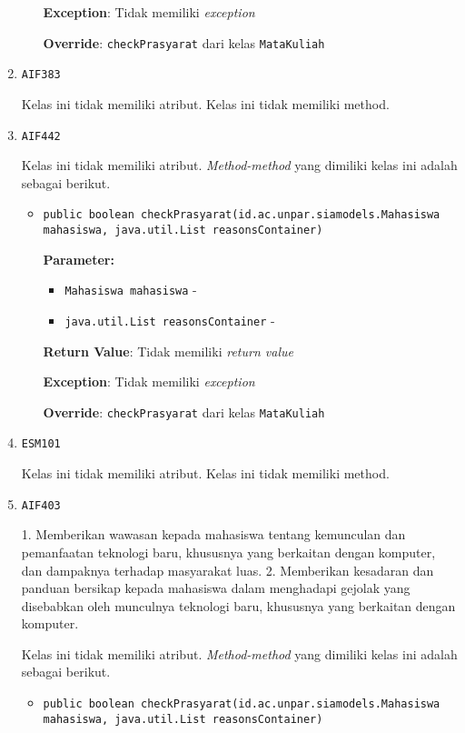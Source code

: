 \documentclass{article}
\begin{document}
\begin{enumerate}
\begin{itemize}
\textbf{Exception}: Tidak memiliki \textit{exception}

\textbf{Override}: \texttt{checkPrasyarat} dari kelas \texttt{MataKuliah}

\end{itemize}
\item \texttt{AIF383}



Kelas ini tidak memiliki atribut. Kelas ini tidak memiliki method. \item \texttt{AIF442}



Kelas ini tidak memiliki atribut. \textit{Method-method} yang dimiliki kelas ini adalah sebagai berikut.
\begin{itemize}
\item \texttt{public boolean checkPrasyarat(id.ac.unpar.siamodels.Mahasiswa mahasiswa, java.util.List reasonsContainer)}

\textbf{Parameter:}
\begin{itemize}
\item \texttt{Mahasiswa mahasiswa} - 
\item \texttt{java.util.List reasonsContainer} - 
\end{itemize}
\textbf{Return Value}: Tidak memiliki \textit{return value}

\textbf{Exception}: Tidak memiliki \textit{exception}

\textbf{Override}: \texttt{checkPrasyarat} dari kelas \texttt{MataKuliah}

\end{itemize}
\item \texttt{ESM101}



Kelas ini tidak memiliki atribut. Kelas ini tidak memiliki method. \item \texttt{AIF403}

1. Memberikan wawasan kepada mahasiswa tentang kemunculan dan pemanfaatan teknologi baru, 
 khususnya yang berkaitan dengan komputer, dan dampaknya terhadap masyarakat luas.
 2. Memberikan kesadaran dan panduan bersikap kepada mahasiswa dalam menghadapi gejolak yang
 disebabkan oleh munculnya teknologi baru, khususnya yang berkaitan dengan komputer.

Kelas ini tidak memiliki atribut. \textit{Method-method} yang dimiliki kelas ini adalah sebagai berikut.
\begin{itemize}
\item \texttt{public boolean checkPrasyarat(id.ac.unpar.siamodels.Mahasiswa mahasiswa, java.util.List reasonsContainer)}


\end{itemize}
\end{enumerate}
\end{document}
